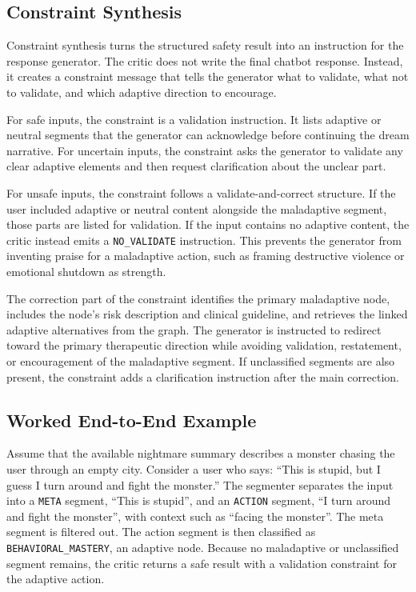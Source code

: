 \subsection{Constraint Synthesis}

Constraint synthesis turns the structured safety result into an instruction for the response generator. The critic does not write the final chatbot response. Instead, it creates a constraint message that tells the generator what to validate, what not to validate, and which adaptive direction to encourage.

For safe inputs, the constraint is a validation instruction. It lists adaptive or neutral segments that the generator can acknowledge before continuing the dream narrative. For uncertain inputs, the constraint asks the generator to validate any clear adaptive elements and then request clarification about the unclear part.

For unsafe inputs, the constraint follows a validate-and-correct structure. If the user included adaptive or neutral content alongside the maladaptive segment, those parts are listed for validation. If the input contains no adaptive content, the critic instead emits a \texttt{NO\_VALIDATE} instruction. This prevents the generator from inventing praise for a maladaptive action, such as framing destructive violence or emotional shutdown as strength.

The correction part of the constraint identifies the primary maladaptive node, includes the node's risk description and clinical guideline, and retrieves the linked adaptive alternatives from the graph. The generator is instructed to redirect toward the primary therapeutic direction while avoiding validation, restatement, or encouragement of the maladaptive segment. If unclassified segments are also present, the constraint adds a clarification instruction after the main correction.

\subsection{Worked End-to-End Example}

Assume that the available nightmare summary describes a monster chasing the user through an empty city. Consider a user who says: ``This is stupid, but I guess I turn around and fight the monster.'' The segmenter separates the input into a \texttt{META} segment, ``This is stupid'', and an \texttt{ACTION} segment, ``I turn around and fight the monster'', with context such as ``facing the monster''. The meta segment is filtered out. The action segment is then classified as \texttt{BEHAVIORAL\_MASTERY}, an adaptive node. Because no maladaptive or unclassified segment remains, the critic returns a safe result with a validation constraint for the adaptive action.

